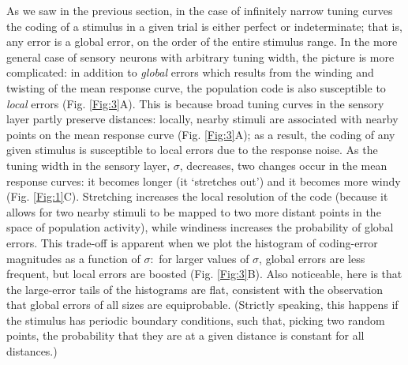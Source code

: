 \documentclass[a4paper]{article}%
\begin{document}
As we saw in the previous section, in the case of infinitely narrow tuning
curves the coding of a stimulus in a given trial is either perfect or
indeterminate; that is, any error is a global error, on the order of the
entire stimulus range. In the more general case of sensory neurons with
arbitrary tuning width, the picture is more complicated: in addition to
\textit{global} errors which results from the winding and twisting of the mean
response curve, the population code is also susceptible to \textit{local}
errors (Fig. \ref{Fig:3}A). This is because broad tuning curves in the sensory
layer partly preserve distances: locally, nearby stimuli are associated with
nearby points on the mean response curve (Fig. \ref{Fig:3}A); as a result, the
coding of any given stimulus is susceptible to local errors due to the
response noise. As the tuning width in the sensory layer, $\sigma$, decreases,
two changes occur in the mean response curves: it becomes longer (it
`stretches out') and it becomes more windy (Fig. \ref{Fig:1}C). Stretching
increases the local resolution of the code (because it allows for two nearby
stimuli to be mapped to two more distant points in the space of population
activity), while windiness increases the probability of global errors. This
trade-off is apparent when we plot the histogram of coding-error magnitudes as
a function of $\sigma$:\ for larger values of $\sigma$, global errors are less
frequent, but local errors are boosted (Fig. \ref{Fig:3}B). Also noticeable,
here is that the large-error tails of the histograms are flat, consistent with
the observation that global errors of all sizes are equiprobable. (Strictly speaking, this happens if the stimulus has periodic boundary conditions, such that, picking two random points, the probability that they are at a given distance is constant for all distances.)
\end{document}
